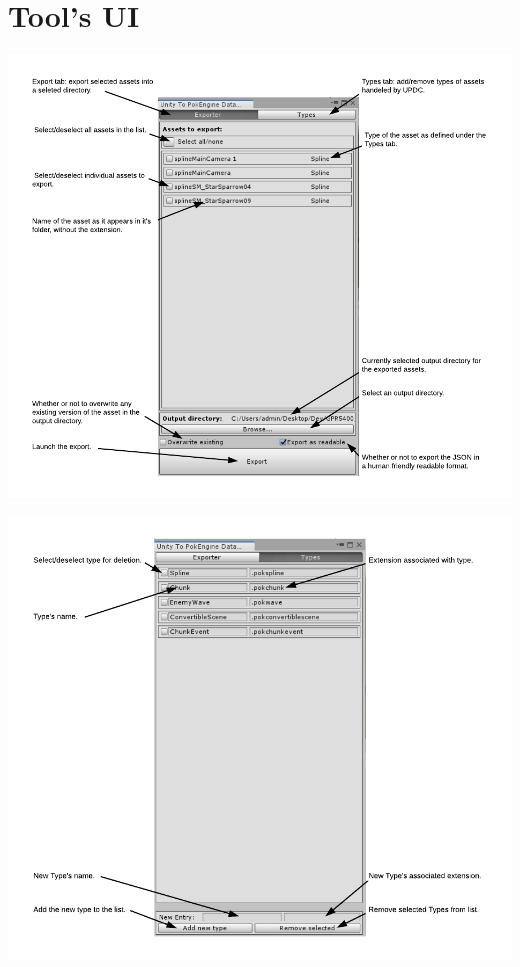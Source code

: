 \documentclass[12pt,a4paper]{article}
\begin{document}
\section{Tool's UI}
\begin{center}
\includegraphics[scale=0.6]{exportUi}
\end{center}
\begin{center}
\includegraphics[scale=0.6]{typesUi}
\end{center}
\end{document}
